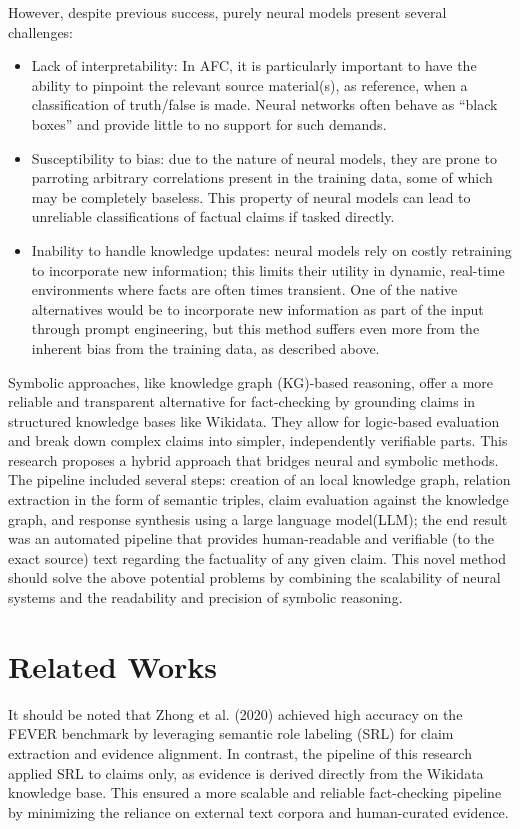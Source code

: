 \documentclass[11pt]{article}
\begin{document}
However, despite previous success, purely neural models present several challenges:
\begin{itemize}
    \item Lack of interpretability: In AFC, it is particularly important to have the ability to pinpoint the relevant source material(s), as reference, when a classification of truth/false is made. Neural networks often behave as “black boxes” and provide little to no support for such demands. 
    \item Susceptibility to bias: due to the nature of neural models, they are prone to parroting arbitrary correlations present in the training data, some of which may be completely baseless. This property of neural models can lead to unreliable classifications of factual claims if tasked directly. 
    \item Inability to handle knowledge updates: neural models rely on costly retraining to incorporate new information; this limits their utility in dynamic, real-time environments where facts are often times transient. One of the native alternatives would be to incorporate new information as part of the input through prompt engineering, but this method suffers even more from the inherent bias from the training data, as described above. 
\end{itemize}

Symbolic approaches, like knowledge graph (KG)-based reasoning, offer a more reliable and transparent alternative for fact-checking by grounding claims in structured knowledge bases like Wikidata. They allow for logic-based evaluation and break down complex claims into simpler, independently verifiable parts.
This research proposes a hybrid approach that bridges neural and symbolic methods. The pipeline included several steps: creation of an local knowledge graph, relation extraction in the form of semantic triples, claim evaluation against the knowledge graph, and response synthesis using a large language model(LLM); the end result was an automated pipeline that provides human-readable and verifiable (to the exact source) text regarding the factuality of any given claim. This novel method should solve the above potential problems by combining the scalability of neural systems and the readability and precision of symbolic reasoning. 

\section{Related Works}
It should be noted that Zhong et al. (2020)\cite{zhong} achieved high accuracy on the FEVER benchmark by leveraging semantic role labeling (SRL) for claim extraction and evidence alignment. In contrast, the pipeline of this research applied SRL to claims only, as evidence is derived directly from the Wikidata knowledge base. This ensured a more scalable and reliable fact-checking pipeline by minimizing the reliance on external text corpora and human-curated evidence.
\end{document}
